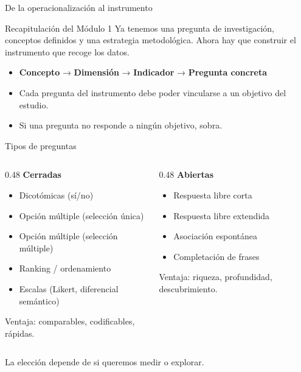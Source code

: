 \documentclass[aspectratio=169, 12pt]{beamer}
\begin{document}
\begin{frame}{De la operacionalización al instrumento}
  \begin{block}{Recapitulación del Módulo 1}
    Ya tenemos una pregunta de investigación, conceptos definidos y una estrategia metodológica. Ahora hay que \alert{construir el instrumento} que recoge los datos.
  \end{block}
  \vspace{0.4cm}
  \begin{itemize}
    \item \textbf{Concepto} → \textbf{Dimensión} → \textbf{Indicador} → \textbf{Pregunta concreta}
    \item Cada pregunta del instrumento debe poder vincularse a un objetivo del estudio.
    \item Si una pregunta no responde a ningún objetivo, sobra.
  \end{itemize}
\end{frame}

\begin{frame}{Tipos de preguntas}
  \begin{columns}[T]
    \begin{column}{0.48\textwidth}
      \textbf{\color{daMagenta}Cerradas}
      \begin{itemize}
        \small
        \item Dicotómicas (sí/no)
        \item Opción múltiple (selección única)
        \item Opción múltiple (selección múltiple)
        \item Ranking / ordenamiento
        \item Escalas (Likert, diferencial semántico)
      \end{itemize}
      \vspace{0.2cm}
      {\color{daTextMid}\tiny Ventaja: comparables, codificables, rápidas.}
    \end{column}
    \begin{column}{0.48\textwidth}
      \textbf{\color{daPurpleLight}Abiertas}
      \begin{itemize}
        \small
        \item Respuesta libre corta
        \item Respuesta libre extendida
        \item Asociación espontánea
        \item Completación de frases
      \end{itemize}
      \vspace{0.2cm}
      {\color{daTextMid}\tiny Ventaja: riqueza, profundidad, descubrimiento.}
    \end{column}
  \end{columns}
  \vspace{0.4cm}
  {\small La elección depende de si queremos \alert{medir} o \alert{explorar}.}
\end{frame}
\end{document}
